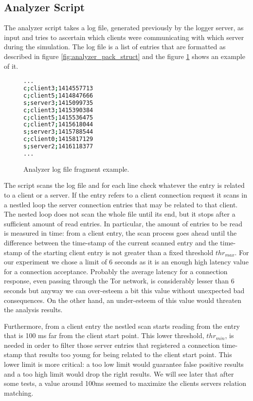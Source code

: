\subsection{Analyzer Script}
The analyzer script takes a log file, generated previously by the logger
server, as input and tries to
ascertain which clients were communicating with which server during the
simulation. The log file is a list of entries that are formatted as described in
 figure \ref{fig:analyzer_pack_struct} and the figure
\ref{fig:example_log_file} shows an example of it.
\begin{figure}[H]
\centering
\begin{lstlisting}[language=bash,frame=single]
...
c;client3;1414557713
c;client5;1414847666
s;server3;1415099735
c;client3;1415390384
c;client5;1415536475
c;client7;1415618044
s;server3;1415788544
c;client0;1415817129
s;server2;1416118377
...
\end{lstlisting}
\caption{Analyzer log file fragment example.}
\label{fig:example_log_file}
\end{figure}
The script scans the log file and for each line check whatever the entry is
related to a client or a server. If the entry refers to a client
connection request it scans in a nestled loop the server connection entries
that may be related to that client. The nested loop does not scan the whole
file until its end, but it stops after a sufficient amount of
read entries. In particular, the amount of entries to be read is
measured in time: from a client entry, the scan process goes
ahead until the difference between the time-stamp of the current scanned 
entry and the time-stamp of the starting client entry is not greater
than a fixed threshold $thr_{max}$. For our experiment we chose a limit of 6
seconds as it is an enough high latency
value for a connection acceptance. Probably the average latency for a
connection response, even passing through the Tor network, is
considerably lesser than 6 seconds but anyway we can over-esteem a bit this
value without unexpected bad consequences. On the other hand, an under-esteem of
this value would threaten the analysis results. 

Furthermore, from a client
entry the nestled scan starts reading from the entry that is 100 ms far
from the client start point. This lower threshold, $thr_{min}$, is needed in order to
 filter those server entries that registered a connection time-stamp
that results too young for being related to the client start point. This
lower limit is more critical: a too low limit would guarantee false
positive results and a too high limit would drop the right results.
We will see later that after some tests, a value around 100ms seemed to maximize 
the clients servers relation matching. %

